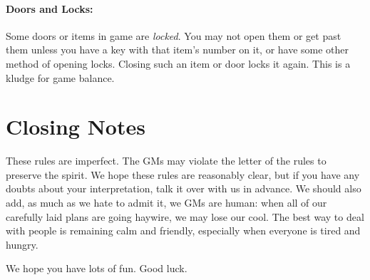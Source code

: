\documentclass[sheet]{airship}
\begin{document}
\paragraph{Doors and Locks:} Some doors or items in game are {\em locked}. You may not open them or get past them unless you have a key with that item's number on it, or have some other method of opening locks. Closing such an item or door locks it again. This is a kludge for game balance.

\section{Closing Notes}

These rules are imperfect.  The GMs may violate the letter of the
rules to preserve the spirit.  We hope these rules are reasonably
clear, but if you have any doubts about your interpretation, talk it
over with us in advance.  We should also add, as much as we hate to
admit it, we GMs are human: when all of our carefully laid plans are
going haywire, we may lose our cool.  The best way to deal with people
is remaining calm and friendly, especially when everyone is tired and
hungry.

We hope you have lots of fun.  Good luck.
\end{document}
